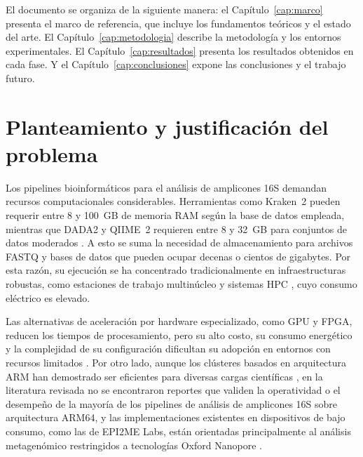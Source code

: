 \documentclass[12pt,oneside,spanish]{book}
\begin{document}
    El documento se organiza de la siguiente manera: el Capítulo~\ref{cap:marco} presenta el marco de referencia, que incluye los fundamentos teóricos y el estado del arte. El Capítulo~\ref{cap:metodologia} describe la metodología y los entornos experimentales. El Capítulo~\ref{cap:resultados} presenta los resultados obtenidos en cada fase. Y el Capítulo~\ref{cap:conclusiones} expone las conclusiones y el trabajo futuro.
    
    
    \section*{Planteamiento y justificación del problema}
    
    Los pipelines bioinformáticos para el análisis de amplicones 16S demandan recursos computacionales considerables. Herramientas como Kraken~2 \citep{wood2019kraken2, wood2024manual} pueden requerir entre 8 y 100~GB de memoria RAM según la base de datos empleada, mientras que DADA2 y QIIME~2 requieren entre 8 y 32~GB para conjuntos de datos moderados \citep{callahan2016dada2, bolyen2019qiime2}. A esto se suma la necesidad de almacenamiento para archivos FASTQ y bases de datos que pueden ocupar decenas o cientos de gigabytes. Por esta razón, su ejecución se ha concentrado tradicionalmente en infraestructuras robustas, como estaciones de trabajo multinúcleo y sistemas HPC \citep{seppey2025lemmi}, cuyo consumo eléctrico es elevado.
    
    Las alternativas de aceleración por hardware especializado, como GPU y FPGA, reducen los tiempos de procesamiento, pero su alto costo, su consumo energético y la complejidad de su configuración dificultan su adopción en entornos con recursos limitados \citep{robinson2021hardware}. Por otro lado, aunque los clústeres basados en arquitectura ARM han demostrado ser eficientes para diversas cargas científicas \citep{maqbool2015arm, warade2022}, en la literatura revisada no se encontraron reportes que validen la operatividad o el desempeño de la mayoría de los pipelines de análisis de amplicones 16S sobre arquitectura ARM64, y las implementaciones existentes en dispositivos de bajo consumo, como las de EPI2ME Labs, están orientadas principalmente al análisis metagenómico restringidos a tecnologías Oxford Nanopore \citep{ont2024wfmetagenomics}.
    
\end{document}
